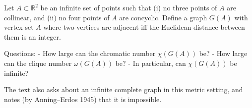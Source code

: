 Let $A\subset\mathbb{R}^2$ be an infinite set of points such that
(i) no three points of $A$ are collinear, and
(ii) no four points of $A$ are concyclic.
Define a graph $G(A)$ with vertex set $A$ where two vertices are adjacent iff the Euclidean distance between them is an integer.

Questions:
- How large can the chromatic number $\chi(G(A))$ be?
- How large can the clique number $\omega(G(A))$ be?
- In particular, can $\chi(G(A))$ be infinite?

The text also asks about an infinite complete graph in this metric setting, and notes (by Anning--Erdos 1945) that it is impossible.
